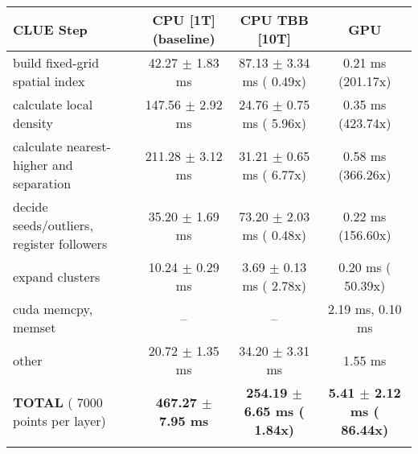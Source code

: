     \begin{tabular}{l|c|c|c}
    \hline
    CLUE Step                                 & CPU [1T] (baseline)         & CPU TBB [10T]                         & GPU                       \\ \hline
    build fixed-grid spatial index            &  42.27 $\pm$  1.83 ms       &  87.13 $\pm$  3.34 ms ( 0.49x)        &   0.21 ms (201.17x)       \\
    calculate local density                   & 147.56 $\pm$  2.92 ms       &  24.76 $\pm$  0.75 ms ( 5.96x)        &   0.35 ms (423.74x)       \\
    calculate nearest-higher and separation   & 211.28 $\pm$  3.12 ms       &  31.21 $\pm$  0.65 ms ( 6.77x)        &   0.58 ms (366.26x)       \\
    decide seeds/outliers, register followers &  35.20 $\pm$  1.69 ms       &  73.20 $\pm$  2.03 ms ( 0.48x)        &   0.22 ms (156.60x)       \\
    expand clusters                           &  10.24 $\pm$  0.29 ms       &   3.69 $\pm$  0.13 ms ( 2.78x)        &   0.20 ms ( 50.39x)       \\ \hline
    cuda memcpy, memset                       & --                          & --                                    &   2.19 ms,   0.10 ms      \\ 
    other                                     &  20.72 $\pm$  1.35 ms       &  34.20 $\pm$  3.31 ms                 &   1.55 ms                 \\ \hline
    \textbf{TOTAL} ( 7000 points per layer)   & \textbf{467.27 $\pm$  7.95 ms} & \textbf{254.19 $\pm$  6.65 ms ( 1.84x)} & \textbf{  5.41 $\pm$  2.12 ms ( 86.44x)}  \\
    \hline
    \multicolumn{4}{c}{} 
    \end{tabular}
    \linebreak


